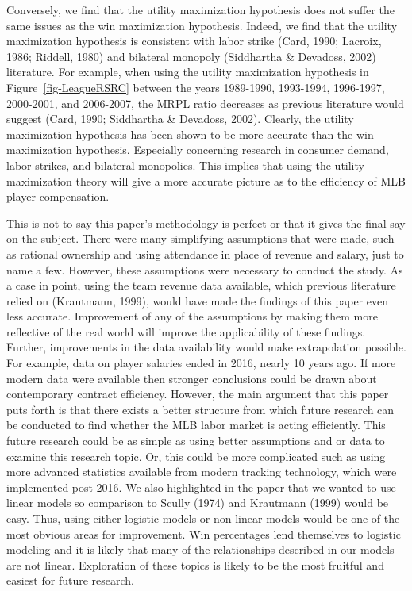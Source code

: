 \documentclass[
  12pt,
  letterpaper,
  DIV=11,
  numbers=noendperiod]{scrartcl}
\begin{document}
Conversely, we find that the utility maximization hypothesis does not
suffer the same issues as the win maximization hypothesis. Indeed, we
find that the utility maximization hypothesis is consistent with labor
strike (Card, 1990; Lacroix, 1986; Riddell, 1980) and bilateral monopoly
(Siddhartha \& Devadoss, 2002) literature. For example, when using the
utility maximization hypothesis in Figure~\ref{fig-LeagueRSRC} between
the years 1989-1990, 1993-1994, 1996-1997, 2000-2001, and 2006-2007, the
MRPL ratio decreases as previous literature would suggest (Card, 1990;
Siddhartha \& Devadoss, 2002). Clearly, the utility maximization
hypothesis has been shown to be more accurate than the win maximization
hypothesis. Especially concerning research in consumer demand, labor
strikes, and bilateral monopolies. This implies that using the utility
maximization theory will give a more accurate picture as to the
efficiency of MLB player compensation.

This is not to say this paper's methodology is perfect or that it gives
the final say on the subject. There were many simplifying assumptions
that were made, such as rational ownership and using attendance in place
of revenue and salary, just to name a few. However, these assumptions
were necessary to conduct the study. As a case in point, using the team
revenue data available, which previous literature relied on (Krautmann,
1999), would have made the findings of this paper even less accurate.
Improvement of any of the assumptions by making them more reflective of
the real world will improve the applicability of these findings.
Further, improvements in the data availability would make extrapolation
possible. For example, data on player salaries ended in 2016, nearly 10
years ago. If more modern data were available then stronger conclusions
could be drawn about contemporary contract efficiency. However, the main
argument that this paper puts forth is that there exists a better
structure from which future research can be conducted to find whether
the MLB labor market is acting efficiently. This future research could
be as simple as using better assumptions and or data to examine this
research topic. Or, this could be more complicated such as using more
advanced statistics available from modern tracking technology, which
were implemented post-2016. We also highlighted in the paper that we
wanted to use linear models so comparison to Scully (1974) and Krautmann
(1999) would be easy. Thus, using either logistic models or non-linear
models would be one of the most obvious areas for improvement. Win
percentages lend themselves to logistic modeling and it is likely that
many of the relationships described in our models are not linear.
Exploration of these topics is likely to be the most fruitful and
easiest for future research.
\end{document}
